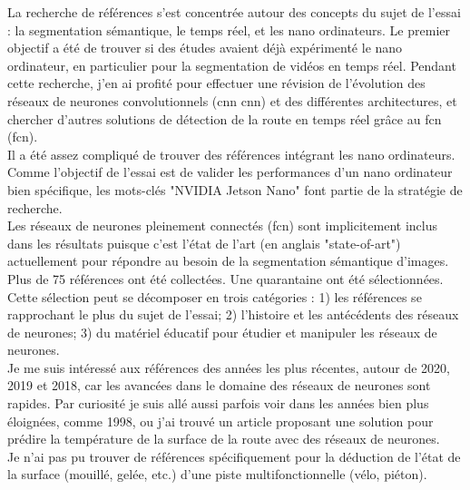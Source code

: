 ﻿\noindent La recherche de références s'est concentrée autour des concepts du sujet de l'essai : la segmentation sémantique, le temps réel, et les nano ordinateurs. Le premier objectif a été de trouver si des études avaient déjà expérimenté le nano ordinateur, en particulier pour la segmentation de vidéos en temps réel. Pendant cette recherche, j'en ai profité pour effectuer une révision de l'évolution des réseaux de neurones convolutionnels (\acrshort{cnn} \acrlong{cnn}) et des différentes architectures, et chercher d'autres solutions de détection de la route en temps réel grâce au \acrlong{fcn} (\acrshort{fcn}). 
\vspace{\baselineskip}
\\
\noindent Il a été assez compliqué de trouver des références intégrant les nano ordinateurs. Comme l'objectif de l'essai est de valider les performances d'un nano ordinateur bien spécifique, les mots-clés "NVIDIA Jetson Nano" font partie de la stratégie de recherche. 
\vspace{\baselineskip}
\\
\noindent Les réseaux de neurones pleinement connectés (\acrshort{fcn}) sont implicitement inclus dans les résultats puisque c'est l'état de l'art (en anglais "state-of-art") actuellement pour répondre au besoin de la segmentation sémantique d'images.
\vspace{\baselineskip}
\\
\noindent Plus de 75 références ont été collectées. Une quarantaine ont été sélectionnées. Cette sélection peut se décomposer en trois catégories : 1) les références se rapprochant le plus du sujet de l'essai; 2) l'histoire et les antécédents des réseaux de neurones; 3) du matériel éducatif pour étudier et manipuler les réseaux de neurones.
\vspace{\baselineskip}
\\
\noindent Je me suis intéressé aux références des années les plus récentes, autour de 2020, 2019 et 2018, car les avancées dans le domaine des réseaux de neurones sont rapides. Par curiosité je suis allé aussi parfois voir dans les années bien plus éloignées, comme 1998, ou j'ai trouvé un article proposant une solution pour prédire la température de la surface de la route avec des réseaux de neurones.
\vspace{\baselineskip}
\\
\noindent Je n'ai pas pu trouver de références spécifiquement pour la déduction de l'état de la surface (mouillé, gelée, etc.) d'une piste multifonctionnelle (vélo, piéton).